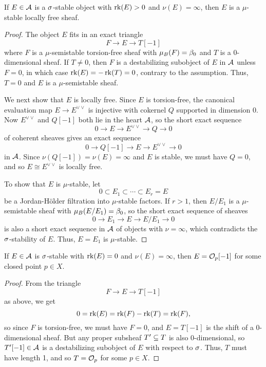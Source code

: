 
\begin{lem}\label{sigmaStablePosRkIsMuStable}
    If $E \in \mathcal{A}$ is a $\sigma$-stable object with $\operatorname{\mathrm{rk}}(E) > 0$ and $\nu(E) = \infty$, then $E$ is a $\mu$-stable locally free sheaf.
\end{lem}
\begin{proof}
    The object $E$ fits in an exact triangle
    \[ F \to E \to T[-1] \]
    where $F$ is a $\mu$-semistable torsion-free sheaf with $\mu_B(F) = \beta_0$ and $T$ is a 0-dimensional sheaf. If $T \neq 0$, then $F$ is a destabilizing subobject of $E$ in $\mathcal{A}$ unless $F = 0$, in which case $\operatorname{\mathrm{rk}}(E) = -\operatorname{\mathrm{rk}}(T) = 0$, contrary to the assumption. Thus, $T = 0$ and $E$ is a $\mu$-semistable sheaf.
    
    We next show that $E$ is locally free. Since $E$ is torsion-free, the canonical evaluation map $E \to E^{\vee \vee}$ is injective with cokernel $Q$ supported in dimension 0. Now $E^{\vee\vee}$ and $Q[-1]$ both lie in the heart $\mathcal{A}$, so the short exact sequence 
    \[ 0 \to E \to E^{\vee \vee} \to Q \to 0 \]
    of coherent sheaves gives an exact sequence
    \[ 0 \to Q[-1] \to E \to E^{\vee \vee} \to 0 \]
    in $\mathcal{A}$. Since $\nu(Q[-1]) = \nu(E) = \infty$ and $E$ is stable, we must have $Q = 0$, and so $E \cong E^{\vee\vee}$ is locally free.
    
    To show that $E$ is $\mu$-stable, let
    \[ 0 \subset E_1 \subset \cdots \subset E_r = E \]
    be a Jordan-H\"older filtration into $\mu$-stable factors. If $r > 1$, then $E/E_1$ is a $\mu$-semistable sheaf with $\mu_B(E/E_1) = \beta_0$, so the short exact sequence of sheaves
    \[ 0 \to E_1 \to E \to E/E_1 \to 0 \]
    is also a short exact sequence in $\mathcal{A}$ of objects with $\nu = \infty$, which contradicts the $\sigma$-stability of $E$. Thus, $E = E_1$ is $\mu$-stable.
\end{proof}

\begin{lem}\label{sigmaStableRk0isSkyscraper}
    If $E \in \mathcal{A}$ is $\sigma$-stable with $\operatorname{\mathrm{rk}}(E) = 0$ and $\nu(E) = \infty$, then $E = \mathcal{O}_p[-1]$ for some closed point $p \in X$.
\end{lem}
\begin{proof}
    From the triangle
    \[ F \to E \to T[-1] \]
    as above, we get 
    \[ 0 = \operatorname{\mathrm{rk}}(E) = \operatorname{\mathrm{rk}}(F) - \operatorname{\mathrm{rk}}(T) = \operatorname{\mathrm{rk}}(F), \]
    so since $F$ is torsion-free, we must have $F = 0$, and $E = T[-1]$ is the shift of a 0-dimensional sheaf. But any proper subsheaf $T' \subseteq T$ is also 0-dimensional, so $T'[-1] \in \mathcal{A}$ is a destabilizing subobject of $E$ with respect to $\sigma$. Thus, $T$ must have length 1, and so $T = \mathcal{O}_p$ for some $p \in X$.
\end{proof}

